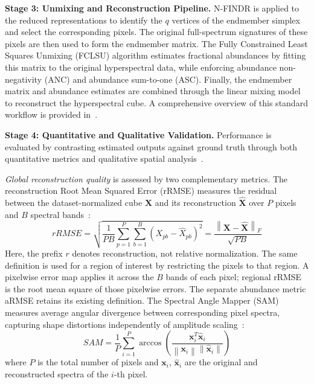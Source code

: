 \documentclass{article}
\begin{document}
\textbf{Stage 3: Unmixing and Reconstruction Pipeline.} N-FINDR is applied to the reduced representations to identify the $q$ vertices of the endmember simplex and select the corresponding pixels. The original full-spectrum signatures of these pixels are then used to form the endmember matrix. The Fully Constrained Least Squares Unmixing (FCLSU) algorithm estimates fractional abundances by fitting this matrix to the original hyperspectral data, while enforcing abundance non-negativity (ANC) and abundance sum-to-one (ASC). Finally, the endmember matrix and abundance estimates are combined through the linear mixing model to reconstruct the hyperspectral cube. A comprehensive overview of this standard workflow is provided in~\cite{bioucas2012hyperspectral}.


\textbf{Stage 4: Quantitative and Qualitative Validation.} Performance is evaluated by contrasting estimated outputs against ground truth through both quantitative metrics and qualitative spatial analysis~\cite{bioucas2012hyperspectral}.

\textit{Global reconstruction quality} is assessed by two complementary metrics. The reconstruction Root Mean Squared Error (rRMSE) measures the residual between the dataset-normalized cube $\mathbf{X}$ and its reconstruction $\hat{\mathbf{X}}$ over $P$ pixels and $B$ spectral bands~\cite{gimenez2025hyperspectral}:
\begin{equation}
    rRMSE = \sqrt{\frac{1}{PB}\sum_{p=1}^{P}\sum_{b=1}^{B}
    (X_{pb}-\hat{X}_{pb})^2}
    = \frac{\left\| \mathbf{X} - \hat{\mathbf{X}} \right\|_F}{\sqrt{PB}}
    \label{eq:rrmse}
\end{equation}
Here, the prefix $r$ denotes reconstruction, not relative normalization. The
same definition is used for a region of interest by restricting the pixels
to that region. A pixelwise error map applies it across the $B$ bands of
each pixel; regional rRMSE is the root mean square of those pixelwise errors.
The separate abundance metric aRMSE retains its existing definition.
The Spectral Angle Mapper (SAM) measures average angular divergence between corresponding pixel spectra, capturing shape distortions independently of amplitude scaling~\cite{bioucas2012hyperspectral}:
\begin{equation}
    SAM = \frac{1}{P} \sum_{i=1}^{P} \arccos \left( \frac{\mathbf{x}_i^T \hat{\mathbf{x}}_i}{\left\| \mathbf{x}_i \right\| \left\| \hat{\mathbf{x}}_i \right\|} \right)
    \label{eq:sam}
\end{equation}
where $P$ is the total number of pixels and $\mathbf{x}_i$, $\hat{\mathbf{x}}_i$ are the original and reconstructed spectra of the $i$-th pixel.
\end{document}
